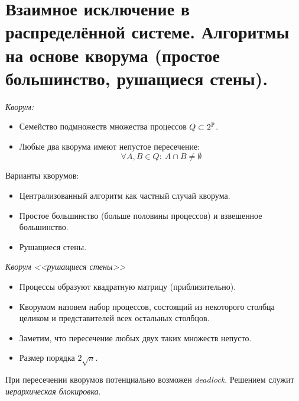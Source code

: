 \section{Взаимное исключение в распределённой системе.
Алгоритмы на основе кворума (простое большинство, рушащиеся стены).}

\begin{definition} \textit{Кворум:}
    \begin{itemize}
        \item Семейство подмножеств множества процессов $Q \subset 2^{\mathbb{P}}$.
        \item Любые два кворума имеют непустое пересечение:
            \[
                \forall A, B \in Q\colon~ A \cap B \neq \emptyset
            \]
    \end{itemize}
\end{definition}

\begin{examples} Варианты кворумов:
    \begin{itemize}
        \item Централизованный алгоритм как частный случай кворума.
        \item Простое большинство (больше половины процессов) и взвешенное большинство.
        \item Рушащиеся стены.
    \end{itemize}
\end{examples}

\begin{definition} \textit{Кворум <<рушащиеся стены>>}
    \begin{itemize}
        \item Процессы образуют квадратную матрицу (приблизительно).
        \item Кворумом назовем набор процессов, состоящий из некоторого столбца 
            целиком и представителей всех остальных столбцов.
        \item Заметим, что пересечение любых двух таких множеств непусто.
        \item Размер порядка $2\sqrt{n}$.
    \end{itemize}
\end{definition}

\begin{remark}
    При пересечении кворумов потенциально возможен \textit{deadlock}. Решением служит
    \textit{иерархическая блокировка}.
\end{remark}
